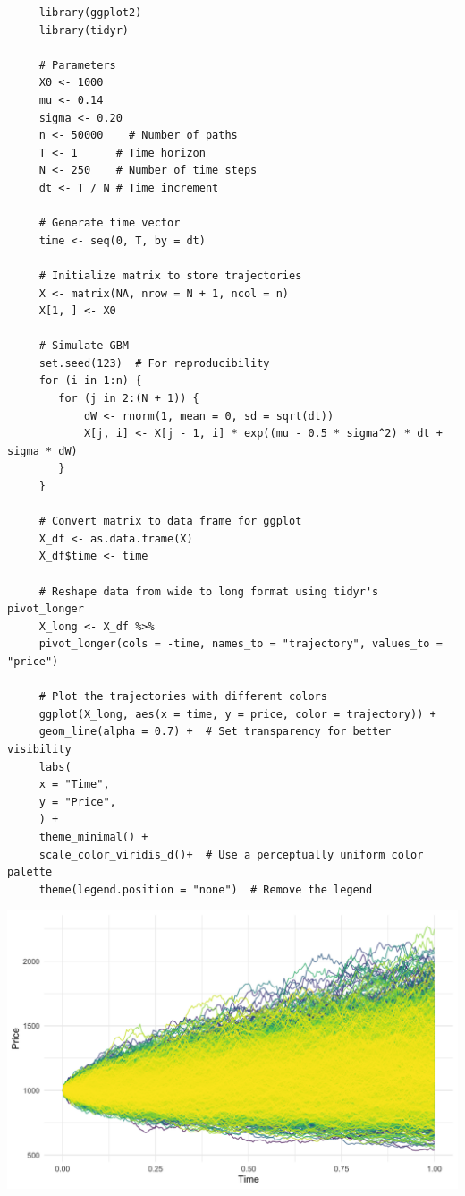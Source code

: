 \documentclass[letterpaper]{article}
\begin{document}
			 \begin{lstlisting}
     library(ggplot2)
     library(tidyr)
     
     # Parameters
     X0 <- 1000
     mu <- 0.14
     sigma <- 0.20
     n <- 50000    # Number of paths
     T <- 1      # Time horizon
     N <- 250    # Number of time steps
     dt <- T / N # Time increment
     
     # Generate time vector
     time <- seq(0, T, by = dt)
     
     # Initialize matrix to store trajectories
     X <- matrix(NA, nrow = N + 1, ncol = n)
     X[1, ] <- X0
     
     # Simulate GBM
     set.seed(123)  # For reproducibility
     for (i in 1:n) {
     	for (j in 2:(N + 1)) {
     		dW <- rnorm(1, mean = 0, sd = sqrt(dt))
     		X[j, i] <- X[j - 1, i] * exp((mu - 0.5 * sigma^2) * dt + sigma * dW)
     	}
     }
     
     # Convert matrix to data frame for ggplot
     X_df <- as.data.frame(X)
     X_df$time <- time
     
     # Reshape data from wide to long format using tidyr's pivot_longer
     X_long <- X_df %>%
     pivot_longer(cols = -time, names_to = "trajectory", values_to = "price")
     
     # Plot the trajectories with different colors
     ggplot(X_long, aes(x = time, y = price, color = trajectory)) +
     geom_line(alpha = 0.7) +  # Set transparency for better visibility
     labs(
     x = "Time",
     y = "Price",
     ) +
     theme_minimal() +
     scale_color_viridis_d()+  # Use a perceptually uniform color palette
     theme(legend.position = "none")  # Remove the legend
			 \end{lstlisting}
			
			\includegraphics[max width=\textwidth, center]{Q2_R_5000}
			
\end{document}
